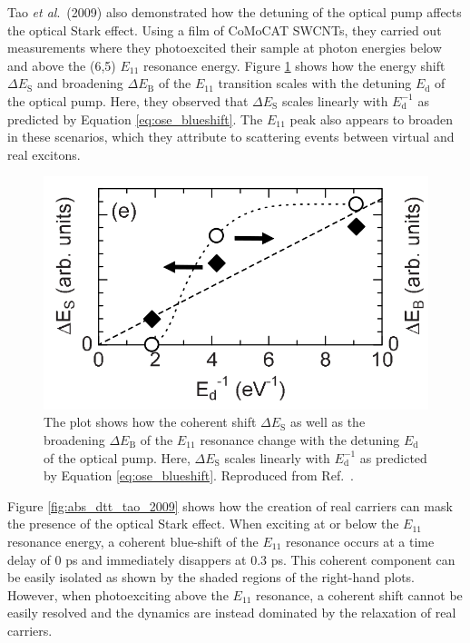 Tao \textit{et al}.\ (2009) also demonstrated how the detuning of the optical pump affects the optical Stark effect. Using a film of CoMoCAT SWCNTs, they carried out measurements where they photoexcited their sample at photon energies below and above the (6,5) $E_{11}$ resonance energy. Figure \ref{fig:detuning_tao_2009} shows how the energy shift $\Delta E_\text{S}$ and broadening $\Delta E_\text{B}$ of the $E_{11}$ transition scales with the detuning $E_\text{d}$ of the optical pump. Here, they observed that $\Delta E_\text{S}$ scales linearly with $E_\text{d}^{-1}$ as predicted by Equation \eqref{eq:ose_blueshift}. The $E_{11}$ peak also appears to broaden in these scenarios, which they attribute to scattering events between virtual and real excitons.

\begin{figure}[ht]
	\centering
	\includegraphics[scale=0.35]{images/chapter_prior_works/fluence_tao_2009}
	\caption{The plot shows how the coherent shift $\Delta E_\text{S}$ as well as the broadening $\Delta E_\text{B}$ of the $E_{11}$ resonance change with the detuning $E_\text{d}$ of the optical pump. Here, $\Delta E_\text{S}$ scales linearly with $E_\text{d}^{-1}$ as predicted by Equation \eqref{eq:ose_blueshift}. Reproduced from Ref.\ \cite{tao2009subpicosecond}.}
	\label{fig:detuning_tao_2009}
\end{figure}

Figure \ref{fig:abs_dtt_tao_2009} shows how the creation of real carriers can mask the presence of the optical Stark effect. When exciting at or below the $E_{11}$ resonance energy, a coherent blue-shift of the $E_{11}$ resonance occurs at a time delay of 0 ps and immediately disappers at 0.3 ps. This coherent component can be easily isolated as shown by the shaded regions of the right-hand plots. However, when photoexciting above the $E_{11}$ resonance, a coherent shift cannot be easily resolved and the dynamics are instead dominated by the relaxation of real carriers.


